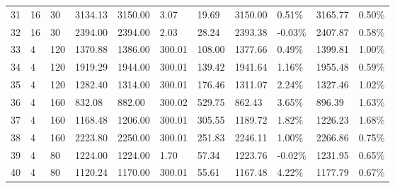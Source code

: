 \documentclass[../main]{subfiles}
\begin{document}
\begin{longtable}{l|ll|lll|lllll}
   31                  & 16                              & 30                     & 3134.13             & 3150.00  & 3.07          & 19.69                      & \cellcolor{green!25}3150.00 & 0.51\%  & 3165.77 & 0.50\% \\
   32                  & 16                              & 30                     & 2394.00             & 2394.00  & 2.03          & 28.24                      & 2393.38                     & -0.03\% & 2407.87 & 0.58\% \\
   33                  & 4                               & 120                    & 1370.88             & 1386.00  & 300.01        & \cellcolor{green!25}108.00 & \cellcolor{green!25}1377.66 & 0.49\%  & 1399.81 & 1.00\% \\
   34                  & 4                               & 120                    & 1919.29             & 1944.00  & 300.01        & \cellcolor{green!25}139.42 & \cellcolor{green!25}1941.64 & 1.16\%  & 1955.48 & 0.59\% \\
   35                  & 4                               & 120                    & 1282.40             & 1314.00  & 300.01        & \cellcolor{green!25}176.46 & \cellcolor{green!25}1311.07 & 2.24\%  & 1327.46 & 1.02\% \\
   36                  & 4                               & 160                    & 832.08              & 882.00   & 300.02        & 529.75                     & \cellcolor{green!25}862.43  & 3.65\%  & 896.39  & 1.63\% \\
   37                  & 4                               & 160                    & 1168.48             & 1206.00  & 300.01        & 305.55                     & \cellcolor{green!25}1189.72 & 1.82\%  & 1226.23 & 1.68\% \\
   38                  & 4                               & 160                    & 2223.80             & 2250.00  & 300.01        & \cellcolor{green!25}251.83 & \cellcolor{green!25}2246.11 & 1.00\%  & 2266.86 & 0.75\% \\
   39                  & 4                               & 80                     & 1224.00             & 1224.00  & 1.70          & 57.34                      & 1223.76                     & -0.02\% & 1231.95 & 0.65\% \\
   40                  & 4                               & 80                     & 1120.24             & 1170.00  & 300.01        & \cellcolor{green!25}55.61  & \cellcolor{green!25}1167.48 & 4.22\%  & 1177.79 & 0.67\% \\

\end{longtable}
\end{document}
